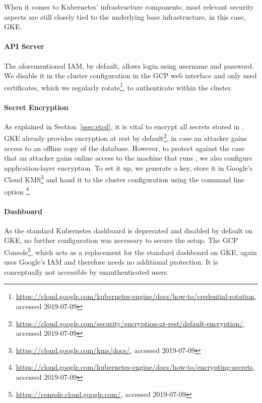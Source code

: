 When it comes to Kubernetes' infrastructure components, most relevant security aspects are still closely tied to the underlying base infrastructure, in this case, \ac{GKE}.

\paragraph{API Server}

The aforementioned \ac{IAM}, by default, allows login using username and password. We disable it in the cluster configuration in the \ac{GCP} web interface and only used certificates, which we regularly rotate\footnote{\url{https://cloud.google.com/kubernetes-engine/docs/how-to/credential-rotation}, accessed 2019-07-09}, to authenticate within the cluster.

\paragraph{Secret Encryption}

As explained in Section~\ref{ssec:etcd}, it is vital to encrypt all secrets stored in . \ac{GKE} already provides encryption at rest by default\footnote{\url{https://cloud.google.com/security/encryption-at-rest/default-encryption/}, accessed 2019-07-09}, in case an attacker gains access to an offline copy of the  database. However, to protect against the case that an attacker gains online access to the machine that runs , we also configure application-layer encryption. To set it up, we generate a key, store it in Google's Cloud \ac{KMS}\footnote{\url{https://cloud.google.com/kms/docs/}, accessed 2019-07-09} and hand it to the cluster configuration using the command line option \footnote{\url{https://cloud.google.com/kubernetes-engine/docs/how-to/encrypting-secrets}, accessed 2019-07-09}.  

\paragraph{Dashboard}

As the standard Kubernetes dashboard is deprecated and disabled by default on \ac{GKE}, no further configuration was necessary to secure the setup. The \ac{GCP} Console\footnote{\url{https://console.cloud.google.com/}, accessed 2019-07-09}, which acts as a replacement for the standard dashboard on \ac{GKE}, again uses Google's \ac{IAM} and therefore needs no additional protection. It is conceptually not accessible by unauthenticated users. 

